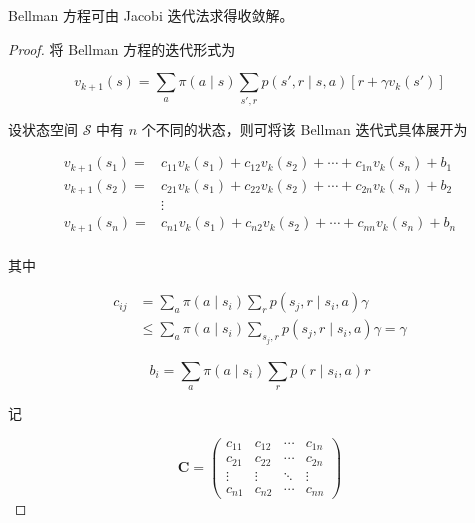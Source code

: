 \begin{definition}\label{the:bellmanjacobi}
    Bellman 方程可由 Jacobi 迭代法求得收敛解。
\end{definition}

\begin{proof}

将 Bellman 方程的迭代形式为

\begin{equation}\label{eq:itebellman}
    v_{k+1}(s) = \sum_a\pi(a\mid s)\sum_{s',r}p(s',r \mid s,a)[r+\gamma v_k(s')]
\end{equation}

设状态空间 $\mathcal S$ 中有 $n$ 个不同的状态，则可将该 Bellman 迭代式具体展开为

\begin{equation}
    \begin{aligned}
        v_{k+1}(s_1)=&c_{11}v_k(s_1)+c_{12}v_k(s_2)+\cdots+c_{1n}v_k(s_n)+b_1\\
        v_{k+1}(s_2)= & c_{21}v_k(s_1)+c_{22}v_k(s_2)+\cdots+c_{2n}v_k(s_n)+b_2\\
        &\vdots\\
        v_{k+1}(s_n)= & c_{n1}v_k(s_1)+c_{n2}v_k(s_2)+\cdots+c_{nn}v_k(s_n)+b_n\\
        \end{aligned}
\end{equation}

其中

\begin{equation}
    \begin{aligned}
        c_{ij} &=\sum_a\pi(a\mid s_i)\sum_{r}p(s_j,r \mid s_i,a)\gamma\\
        &\leq \sum_a\pi(a\mid s_i)\sum_{s_j,r}p(s_j,r \mid s_i,a)\gamma=\gamma
    \end{aligned}
\end{equation}

\begin{equation}
    b_{i} =\sum_a\pi(a\mid s_i)\sum_{r}p(r\mid s_i,a)r
\end{equation}

记

\begin{equation}
    \boldsymbol{C} =
    \left(\begin{array}{cccc}
    c_{11} & c_{12} & \cdots & c_{1n} \\
    c_{21} & c_{22} & \cdots & c_{2n} \\
    \vdots & \vdots & \ddots & \vdots \\
    c_{n1} & c_{n2} & \cdots & c_{nn}
    \end{array}\right)
\end{equation}


\end{proof}
